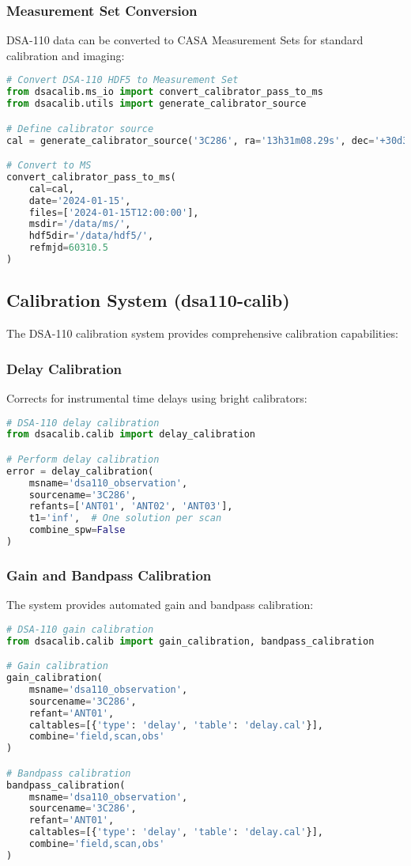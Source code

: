 \documentclass[11pt]{article}
\begin{document}
\subsubsection{Measurement Set Conversion}
DSA-110 data can be converted to CASA Measurement Sets for standard calibration and imaging:

\begin{lstlisting}[language=Python]
# Convert DSA-110 HDF5 to Measurement Set
from dsacalib.ms_io import convert_calibrator_pass_to_ms
from dsacalib.utils import generate_calibrator_source

# Define calibrator source
cal = generate_calibrator_source('3C286', ra='13h31m08.29s', dec='+30d30m32.96s', flux=14.7)

# Convert to MS
convert_calibrator_pass_to_ms(
    cal=cal,
    date='2024-01-15',
    files=['2024-01-15T12:00:00'],
    msdir='/data/ms/',
    hdf5dir='/data/hdf5/',
    refmjd=60310.5
)
\end{lstlisting}

\subsection{Calibration System (dsa110-calib)}

The DSA-110 calibration system provides comprehensive calibration capabilities:

\subsubsection{Delay Calibration}
Corrects for instrumental time delays using bright calibrators:

\begin{lstlisting}[language=Python]
# DSA-110 delay calibration
from dsacalib.calib import delay_calibration

# Perform delay calibration
error = delay_calibration(
    msname='dsa110_observation',
    sourcename='3C286',
    refants=['ANT01', 'ANT02', 'ANT03'],
    t1='inf',  # One solution per scan
    combine_spw=False
)
\end{lstlisting}

\subsubsection{Gain and Bandpass Calibration}
The system provides automated gain and bandpass calibration:

\begin{lstlisting}[language=Python]
# DSA-110 gain calibration
from dsacalib.calib import gain_calibration, bandpass_calibration

# Gain calibration
gain_calibration(
    msname='dsa110_observation',
    sourcename='3C286',
    refant='ANT01',
    caltables=[{'type': 'delay', 'table': 'delay.cal'}],
    combine='field,scan,obs'
)

# Bandpass calibration
bandpass_calibration(
    msname='dsa110_observation',
    sourcename='3C286',
    refant='ANT01',
    caltables=[{'type': 'delay', 'table': 'delay.cal'}],
    combine='field,scan,obs'
)
\end{lstlisting}
\end{document}
